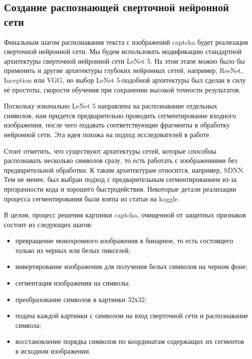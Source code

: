 \subsection{Создание распознающей сверточной нейронной сети}
Финальным шагом распознавания текста с изображений captcha будет реализация сверточной нейронной сети. Мы будем использовать модификацию стандартной архитектуры сверточной нейронной сети LeNet 5\cite{lenet-5-overview}. На этом этапе можно было бы применить и другие архитектуры глубоких нейронных сетей, например, ResNet\cite{resnet-overview}, Inception\cite{inception-overview} или VGG\cite{vgg-overview}, но выбор LeNet 5-подобной архитектуры был сделан в силу её простоты, скорости обучения при сохранении высокой точности результатов.

Поскольку изначально LeNet 5 направлена на распознавание отдельных символов, нам придется предварительно проводить сегментирование входного изображения, после чего подавать соответствующие фрагменты в обработку нейронной сети.
Эта идея похожа на подход исследователей в работе\cite{multidigits-stanford}.

Стоит отметить, что существуют архитектуры сетей, которые способны распознавать несколько символов сразу, то есть работать с изображениями без предварительной обработки. К таким архитектурам относится, например, SDNN\cite{sdnn-overview}. Тем не менее, был выбран подход с предварительным сегментированием из-за прозрачности кода и хорошего быстродействия. Некоторые детали реализации процесса сегментирования были взяты из статьи на kaggle\cite{kaggle-segmentation}.

В целом, процесс решения картинки captcha, очищенной от защитных признаков состоит из следующих шагов:
\begin{itemize}
	\item превращение монохромного изображения в бинарное, то есть состоящего только из черных или белых пикселей;
	\item инвертирование изображения для получения белых символов на черном фоне;
	\item сегментация изображения на символы;
	\item преобразование символов в картинки 32х32;
	\item подача каждой картинки с символом на вход сверточной сети и распознавание символа;
	\item восстановление порядка символов по координатам содержащих их сегментов в исходном изображении.
	
\end{itemize}

